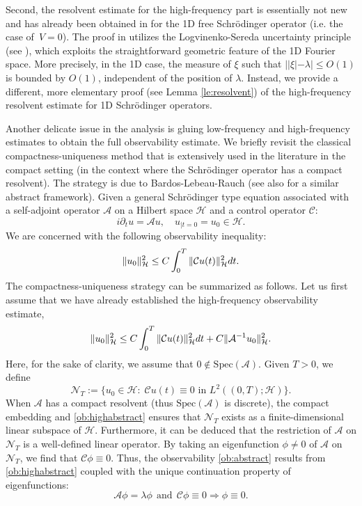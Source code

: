 \documentclass[a4paper,reqno]{amsart}
\theoremstyle{definition}
\numberwithin{equation}{section}
\def \d {{\rm{d}}}
\begin{document}
\smallskip
Second, the resolvent estimate for the high-frequency part is essentially not new and has already been obtained in \cite[Proposition 1]{Gr} for the 1D free Schr\"odinger operator (i.e. the case of~$V=0$). The proof in \cite{Gr} utilizes the Logvinenko-Sereda uncertainty principle (see \cite[Theorem 2]{Ko}), which exploits the straightforward geometric feature of the 1D Fourier space. More precisely, in the 1D case, the measure of $\xi$ such that $||\xi|-\lambda|\leq O(1)$ is bounded by $O(1)$, independent of the position of $\lambda$. Instead, we provide a different, more elementary proof (see Lemma \ref{le:resolvent}) of the high-frequency resolvent estimate for 1D Schr\"odinger operators.

\smallskip
Another delicate issue in the analysis is gluing low-frequency and high-frequency estimates to obtain the full observability estimate. We briefly revisit the classical compactness-uniqueness method that is extensively used in the literature in the compact setting (in the context where the Schr\"odinger operator has a compact resolvent). The strategy is due to Bardos-Lebeau-Rauch \cite{BLR} (see also \cite[Chapter 6]{TuWe} for a similar abstract framework). 
Given a general Schr\"odinger type equation associated with a self-adjoint operator $\mathcal{A}$ on a Hilbert space $\mathcal{H}$ and a control operator $\mathcal{C}$:
$$ i\partial_tu=\mathcal{A}u,\quad u_{|t=0}=u_0\in \mathcal{H}. $$
We are concerned with the following observability inequality:
\begin{align}\label{ob:abstract}
	\|u_0\|_{\mathcal{H}}^2\leq C\int_0^T\|\mathcal{C}u(t)\|_{\mathcal{H}}^2\d t.
\end{align}
The compactness-uniqueness strategy can be summarized as follows. Let us first assume that we have already established the high-frequency observability estimate,
\begin{align}\label{ob:highabstract}
	\|u_0\|_{\mathcal{H}}^2\leq C\int_0^T\|\mathcal{C}u(t)\|_{\mathcal{H}}^2\d t+C\|\mathcal{A}^{-1}u_0\|_{\mathcal{H}}^2.
\end{align}
Here, for the sake of clarity, we assume that $0\notin \mathrm{Spec}(\mathcal{A})$.
Given $T>0$, we define
\[ \mathcal{N}_T:=\{u_0\in \mathcal{H}:\; \mathcal{C}u(t)\equiv 0 \text{ in } L^2((0,T);\mathcal{H})\}. \]
When $\mathcal{A}$ has a compact resolvent (thus $\mathrm{Spec}(\mathcal{A})$ is discrete), the compact embedding and \eqref{ob:highabstract} ensures that $\mathcal{N}_T$ exists as a finite-dimensional linear subspace of $\mathcal{H}$. Furthermore, it can be deduced that the restriction of $\mathcal{A}$ on $\mathcal{N}_T$ is a well-defined linear operator. By taking an eigenfunction $\phi \neq 0$ of $\mathcal{A}$ on $\mathcal{N}_T$, we find that $\mathcal{C}\phi\equiv 0$. Thus, the observability \eqref{ob:abstract} results from \eqref{ob:highabstract} coupled with the unique continuation property of eigenfunctions:
\[ \mathcal{A}\phi=\lambda \phi\ \ \mbox{and}\ \ \mathcal{C}\phi\equiv 0 \Longrightarrow \phi\equiv 0. \]
\end{document}
